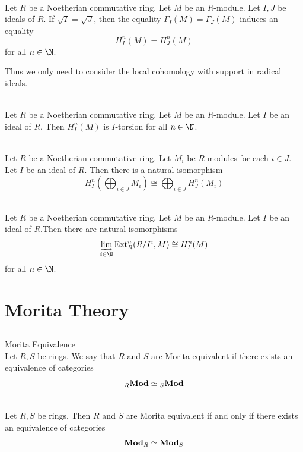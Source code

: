\documentclass[a4paper]{article}
\begin{document}
\begin{prp}{}{}\\
Let $R$ be a Noetherian commutative ring. Let $M$ be an $R$-module. Let $I,J$ be ideals of $R$. If $\sqrt{I}=\sqrt{J}$, then the equality $\Gamma_I(M)=\Gamma_J(M)$ induces an equality $$H_I^n(M)=H_J^n(M)$$ for all $n\in\N$. 
\end{prp}

Thus we only need to consider the local cohomology with support in radical ideals. 

\begin{lmm}{}{}\\
Let $R$ be a Noetherian commutative ring. Let $M$ be an $R$-module. Let $I$ be an ideal of $R$. Then $H_I^n(M)$ is $I$-torsion for all $n\in\N$. 
\end{lmm}

\begin{lmm}{}{}\\
Let $R$ be a Noetherian commutative ring. Let $M_i$ be $R$-modules for each $i\in J$. Let $I$ be an ideal of $R$. Then there is a natural isomorphism $$H_I^n\left(\bigoplus_{i\in J}M_i\right)\cong\bigoplus_{i\in J}H_J^n(M_i)$$
\end{lmm}

\begin{prp}{}{}\\
Let $R$ be a Noetherian commutative ring. Let $M$ be an $R$-module. Let $I$ be an ideal of $R$.Then there are natural isomorphisms $$\varinjlim_{i\in\N}\text{Ext}_R^n(R/I^i,M)\cong H_I^n(M)$$ for all $n\in\N$. 
\end{prp}

\pagebreak
\section{Morita Theory}
\subsection{}
\begin{defn}{Morita Equivalence}{}\\
Let $R,S$ be rings. We say that $R$ and $S$ are Morita equivalent if there exists an equivalence of categories $${_R}\bold{Mod}\simeq{_S}\bold{Mod}$$
\end{defn}

\begin{lmm}{}{}\\
Let $R,S$ be rings. Then $R$ and $S$ are Morita equivalent if and only if there exists an equivalence of categories $$\bold{Mod}_R\simeq\bold{Mod}_S$$
\end{lmm}
\end{document}
